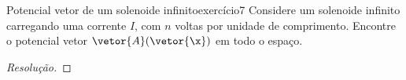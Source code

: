 \begin{exercício}{Potencial vetor de um solenoide infinito}{exercício7}
    Considere um solenoide infinito carregando uma corrente \(I\), com \(n\) voltas por unidade de comprimento. Encontre o potencial vetor \(\vetor{A}(\vetor{\x})\) em todo o espaço.
\end{exercício}
\begin{proof}[Resolução]

\end{proof}
